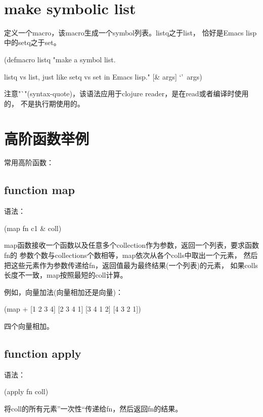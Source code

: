 ﻿\documentclass[a4paper,11pt]{article}
\begin{document}
  \tt %
  \pagestyle{header}
  \sybmaketitle
  \tableofcontents
  \newpage

  \pagestyle{main}
  \setcounter{page}{1}

  \section[make symbolic list]{make symbolic list}
  定义一个macro，该macro生成一个symbol列表。listq之于list，
  恰好是Emacs lisp中的setq之于set。

  \begin{schemecode}
    (defmacro listq
    "make a symbol list.
    
    listq vs list, just like setq vs set in Emacs lisp."
    [& args]
    `'~args)    
  \end{schemecode}

  注意"`"(syntax-quote)，该语法应用于clojure reader，是在read或者编译时使用的，
  不是执行期使用的。

  \section[高阶函数举例]{高阶函数举例}
  常用高阶函数：

  \subsection[function map]{function map}
  语法：\par
  (map fn c1 \& coll)

  map函数接收一个函数以及任意多个collection作为参数，返回一个列表，要求函数fn的
  参数个数与collections个数相等，map依次从各个colls中取出一个元素，
  然后把这些元素作为参数传递给fn，返回值最为最终结果(一个列表)的元素，
  如果colls长度不一致，map按照最短的coll计算。

  例如，向量加法(向量相加还是向量)：\par
  (map + [1 2 3 4] [2 3 4 1] [3 4 1 2] [4 3 2 1])\par
  四个向量相加。

  \subsection[function apply]{function apply}
  语法：\par
  (apply fn coll)

  将coll的所有元素”一次性“传递给fn，然后返回fn的结果。
\end{document}
